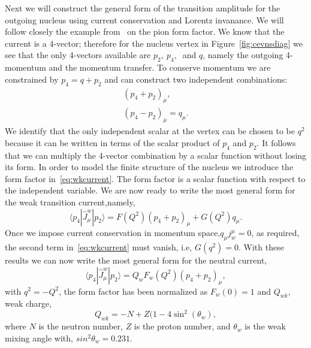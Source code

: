 Next we will construct the general form of the transition amplitude for the outgoing nucleus using current conservation and Lorentz invanance. We will follow closely the example from~\cite{aitchison:2003:gauge} on the pion form factor. We know that the current is a 4-vector; therefore for the nucleus vertex in Figure~\ref{fig:cevnsdiag} we see that the only 4-vectors available are $p_2,\ p_4,\ $ and $q$, namely the outgoing 4-momentum and the momentum transfer. To conserve momentum we are constrained by $p_4=q+p_2$ and can construct two independent combinations:
\begin{gather}
\left( p_4+p_2 \right) _{\mu}, \label{eq:combo1} \\
\left( p_4-p_2 \right) _{\mu}=q_{\mu}. \label{eq:combo2}
\end{gather}
We identify that the only independent scalar at the vertex can be chosen to be $q^2$ because it can be written in terms of the scalar product of $p_4$ and $p_2$. It follows that we can multiply the 4-vector combination by a scalar function without losing its form. In order to model the finite structure of the nucleus we introduce the form factor in~\ref{eq:wkcurrent}. The form factor is a scalar function with respect to the independent variable. We are now ready to write the most general form for the weak transition current,namely,
\begin{equation}\label{eq:wkcurrent}
\langle p_4|\hat{J}_{\mu}^{w}|p_2 \rangle = F(Q^2)\left( p_4+p_2 \right) _{\mu}+G(Q^2)q_{\mu}.
\end{equation} 
Once we impose current conservation in momentum space,$q_{\mu}j_{w}^{\mu}=0$, as required, the second term in~\eqref{eq:wkcurrent} must vanish, i.e, $G(q^2)=0$. With these results we can now write the most general form for the neutral current,
\begin{equation}\label{eq:wktrancurrent}
\boxed{
\langle p_4|\hat{J}_{\mu}^{w}|p_2 \rangle = Q_{w}F_{w}(Q^2)\left( p_4+p_2 \right) _{\mu}
},
\end{equation}
with $q^2=-Q^2$, the form factor has been normalized as $F_{w}(0)=1$ and $Q_{wk}$, weak charge,
\begin{equation}\label{eq:wkcharge}
Q_{wk}=-N+Z(1-4\sin ^2(\theta _w),
\end{equation}
where $N$ is the neutron number, $Z$ is the proton number, and $\theta _w$ is the weak mixing angle with, $ sin^2\theta _w = 0.231$.
 

